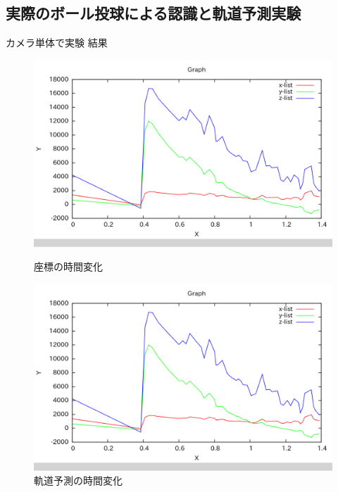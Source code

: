 \documentclass[twocolumn]{preport}
\begin{document}
\subsection{実際のボール投球による認識と軌道予測実験}
カメラ単体で実験
結果

\begin{figure}[tbh]
 \begin{center}
  \begin{minipage}{0.45\columnwidth}
   \includegraphics[width=\columnwidth]{coordinates_graph_316.png}
   \caption{座標の時間変化}
   \label{figure:coords_graph}
  \end{minipage}
  \hspace{0.05\columnwidth}
  \begin{minipage}{0.45\columnwidth}
   \includegraphics[width=\columnwidth]{coordinates_graph_316.png}
   \caption{軌道予測の時間変化}
   \label{figure:est_graph}
  \end{minipage}
 \end{center}
\end{figure}
\end{document}
